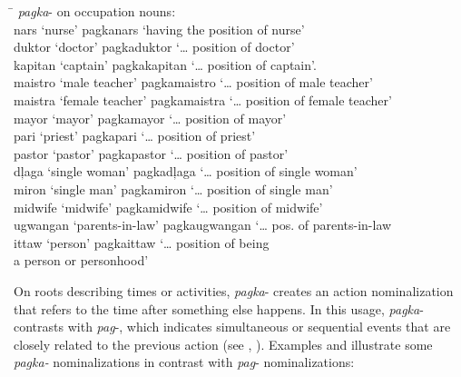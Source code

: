 \ea
\label{ex:captain}
\begin{tabbing}
\hspace{4.5cm} \= \kill
\textit{pagka}{}- on occupation nouns: \\
nars ‘nurse’  \>  pagkanars ‘having the position of nurse’ \\
duktor ‘doctor’ \> pagkaduktor ‘… position  of doctor’ \\
kapitan ‘captain’ \> pagkakapitan ‘… position of captain’. \\
maistro ‘male teacher’ \> pagkamaistro ‘… position of male teacher’ \\
maistra ‘female teacher’ \> pagkamaistra ‘… position of female teacher’ \\
mayor ‘mayor’ \> pagkamayor ‘… position of mayor’ \\
pari ‘priest’  \>  pagkapari ‘… position of priest’ \\
pastor ‘pastor’ \> pagkapastor ‘… position of pastor’ \\
dļaga ‘single woman’ \> pagkadļaga ‘… position of single woman’ \\
miron ‘single man’ \> pagkamiron ‘… position of single man’ \\
midwife ‘midwife’ \> pagkamidwife ‘… position of midwife’ \\
ugwangan ‘parents-in-law’ \> pagkaugwangan ‘… pos. of parents-in-law \\
ittaw ‘person’ \> pagkaittaw ‘… position of being \\
 \> a person or personhood’
\end{tabbing}
\z

On roots describing times or activities, \textit{pagka}{}- creates an action nominalization that refers to the time after something else happens. In this usage, \textit{pagka}{}- contrasts with \textit{pag}{}-, which indicates simultaneous or sequential events that are closely related to the previous action (see , ). Examples  and  illustrate some \textit{pagka-} nominalizations in contrast with \textit{pag}{}- nominalizations:

